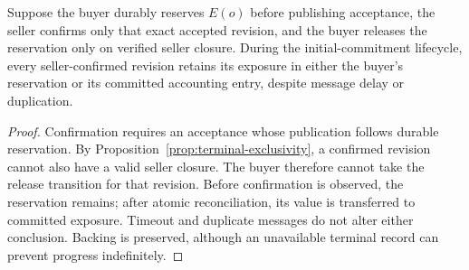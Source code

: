 \begin{proposition}
\label{prop:reservation-backing}
Suppose the buyer durably reserves $E(o)$ before publishing acceptance, the seller confirms only that exact accepted revision, and the buyer releases the reservation only on verified seller closure. During the initial-commitment lifecycle, every seller-confirmed revision retains its exposure in either the buyer's reservation or its committed accounting entry, despite message delay or duplication.
\end{proposition}
\begin{proof}
Confirmation requires an acceptance whose publication follows durable reservation. By Proposition~\ref{prop:terminal-exclusivity}, a confirmed revision cannot also have a valid seller closure. The buyer therefore cannot take the release transition for that revision. Before confirmation is observed, the reservation remains; after atomic reconciliation, its value is transferred to committed exposure. Timeout and duplicate messages do not alter either conclusion. Backing is preserved, although an unavailable terminal record can prevent progress indefinitely.
\end{proof}
